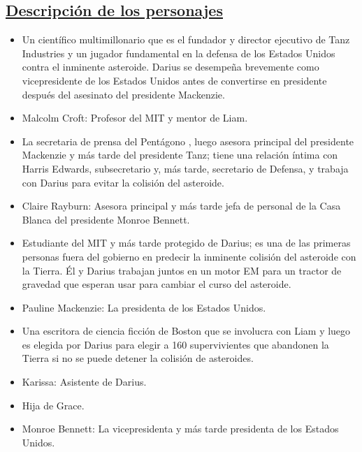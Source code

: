 \documentclass[a5paper,11pt]{article}
\begin{document}
    \subsection{\large{\underline{Descripción de los personajes}}} \small{
    
\begin{itemize}

     \item[\Plane] Un científico multimillonario que es el fundador y director ejecutivo de Tanz Industries y un jugador fundamental en la defensa de los Estados Unidos contra el inminente asteroide. Darius se desempeña brevemente como vicepresidente de los Estados Unidos antes de convertirse en presidente después del asesinato del presidente Mackenzie.
     \item[\Plane] Malcolm Croft: Profesor del MIT y mentor de Liam.
     \item[\Plane] La secretaria de prensa del Pentágono , luego asesora principal del presidente Mackenzie y más tarde del presidente Tanz; tiene una relación íntima con Harris Edwards, subsecretario y, más tarde, secretario de Defensa, y trabaja con Darius para evitar la colisión del asteroide.
     \item[\Plane]  Claire Rayburn: Asesora principal y más tarde jefa de personal de la Casa Blanca del presidente Monroe Bennett.
     \item[\Plane] Estudiante del MIT y más tarde protegido de Darius; es una de las primeras personas fuera del gobierno en predecir la inminente colisión del asteroide con la Tierra. Él y Darius trabajan juntos en un motor EM para un tractor de gravedad que esperan usar para cambiar el curso del asteroide.
     \item[\Plane] Pauline Mackenzie: La presidenta de los Estados Unidos.
     \item[\Plane] Una escritora de ciencia ficción de Boston que se involucra con Liam y luego es elegida por Darius para elegir a 160 supervivientes que abandonen la Tierra si no se puede detener la colisión de asteroides.
     \item[\Plane] Karissa: Asistente de Darius.
     \item[\Plane] Hija de Grace.
     \item[\Plane] Monroe Bennett: La vicepresidenta y más tarde presidenta de los Estados Unidos.

\end{itemize}}
\end{document}

